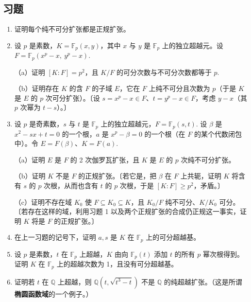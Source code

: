 \subsection*{习题}

\begin{enumerate}
\item 证明每个纯不可分扩张都是正规扩张。

\item 设 \(p\) 是素数，\(K = \mathbb{F}_p(x, y)\)，其中 \(x\) 与 \(y\) 是 \(\mathbb{F}_p\) 上的独立超越元。设 \(F = \mathbb{F}_p(x^p-x,\ y^p-x)\).

（a）证明 \([K:F] = p^2\)，且 \(K/F\) 的可分次数与不可分次数都等于 \(p\).

（b）证明存在 \(K\) 的含 \(F\) 的子域 \(E\)，它在 \(F\) 上纯不可分且次数为 \(p\)（于是 \(K\) 是 \(E\) 的 \(p\) 次可分扩张）。〔设 \(s = x^p-x \in F\)、\(t = y^p-x \in F\)，考虑 \(y-x\)（其 \(p\) 次幂为 \(t-s\)）。〕

\item 设 \(p\) 是奇素数，\(s\) 与 \(t\) 是 \(\mathbb{F}_p\) 上的独立超越元，\(F = \mathbb{F}_p(s, t)\). 设 \(\beta\) 是 \(x^2-sx+t = 0\) 的一个根，\(a\) 是 \(x^p-\beta = 0\) 的一个根（在 \(F\) 的某个代数闭包中）。令 \(E = F(\beta)\)、\(K = F(a)\).

（a）证明 \(E\) 是 \(F\) 的 2 次伽罗瓦扩张，且 \(K\) 是 \(E\) 的 \(p\) 次纯不可分扩张。

（b）证明 \(K\) 不是 \(F\) 的正规扩张。〔若它是，把 \(\beta\) 在 \(F\) 上共轭，证明 \(K\) 将含有 \(s\) 的 \(p\) 次根，从而也含有 \(t\) 的 \(p\) 次根，于是 \([K:F] \geq p^2\)，矛盾。〕

（c）证明不存在域 \(K_0\) 使 \(F \subseteq K_0 \subseteq K\)，且 \(K_0/F\) 纯不可分、\(K/K_0\) 可分。〔若存在这样的域，利用习题 1 以及两个正规扩张的合成仍正规这一事实，证明 \(K\) 将是 \(F\) 的正规扩张。〕

\item 在上一习题的记号下，证明 \(a, s\) 是 \(K\) 在 \(\mathbb{F}_p\) 上的可分超越基。

\item 设 \(p\) 是素数，\(t\) 在 \(\mathbb{F}_p\) 上超越，\(K\) 由向 \(\mathbb{F}_p(t)\) 添加 \(t\) 的所有 \(p\) 幂次根得到。证明 \(K\) 在 \(\mathbb{F}_p\) 上的超越次数为 1，且没有可分超越基。

\item 证明若 \(t\) 在 \(\mathbb{Q}\) 上超越，则 \(\mathbb{Q}(t, \sqrt{t^3-t})\) 不是 \(\mathbb{Q}\) 的纯超越扩张。（这是所谓\textbf{椭圆函数域}的一个例子。）


\end{enumerate}
